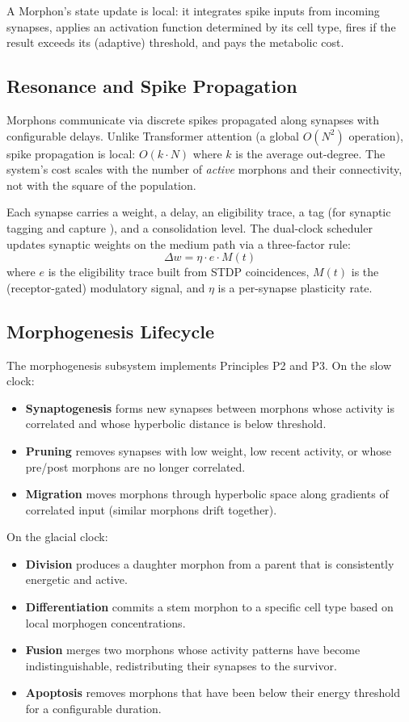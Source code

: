 A Morphon's state update is local: it integrates spike inputs from incoming synapses, applies an activation function determined by its cell type, fires if the result exceeds its (adaptive) threshold, and pays the metabolic cost.

\subsection{Resonance and Spike Propagation}

Morphons communicate via discrete spikes propagated along synapses with configurable delays. Unlike Transformer attention (a global $O(N^2)$ operation), spike propagation is local: $O(k \cdot N)$ where $k$ is the average out-degree. The system's cost scales with the number of \emph{active} morphons and their connectivity, not with the square of the population.

Each synapse carries a weight, a delay, an eligibility trace, a tag (for synaptic tagging and capture \cite{frey1997synaptic}), and a consolidation level. The dual-clock scheduler updates synaptic weights on the medium path via a three-factor rule:
\begin{equation}
\Delta w = \eta \cdot e \cdot M(t)
\end{equation}
where $e$ is the eligibility trace built from STDP coincidences, $M(t)$ is the (receptor-gated) modulatory signal, and $\eta$ is a per-synapse plasticity rate.

\subsection{Morphogenesis Lifecycle}

The morphogenesis subsystem implements Principles P2 and P3. On the slow clock:
\begin{itemize}
  \item \textbf{Synaptogenesis} forms new synapses between morphons whose activity is correlated and whose hyperbolic distance is below threshold.
  \item \textbf{Pruning} removes synapses with low weight, low recent activity, or whose pre/post morphons are no longer correlated.
  \item \textbf{Migration} moves morphons through hyperbolic space along gradients of correlated input (similar morphons drift together).
\end{itemize}
On the glacial clock:
\begin{itemize}
  \item \textbf{Division} produces a daughter morphon from a parent that is consistently energetic and active.
  \item \textbf{Differentiation} commits a stem morphon to a specific cell type based on local morphogen concentrations.
  \item \textbf{Fusion} merges two morphons whose activity patterns have become indistinguishable, redistributing their synapses to the survivor.
  \item \textbf{Apoptosis} removes morphons that have been below their energy threshold for a configurable duration.
\end{itemize}

